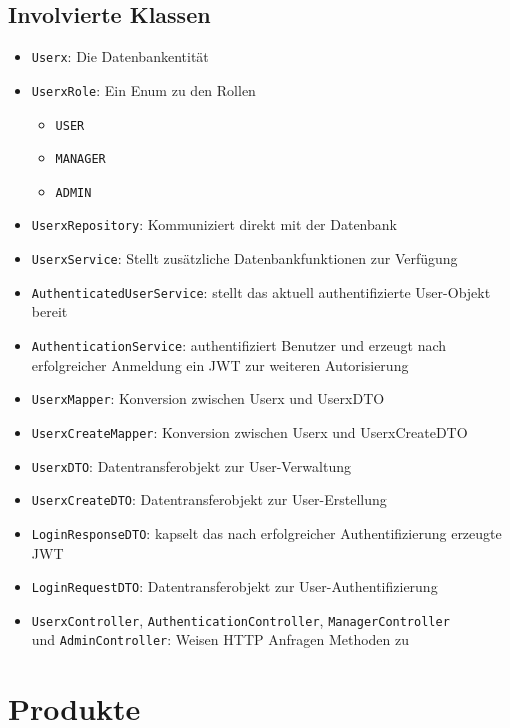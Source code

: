 \documentclass[12pt, a4paper]{scrreprt}
\begin{document}
		
		\section{Involvierte Klassen}
		
		\begin{itemize}
			\item \texttt{Userx}: Die Datenbankentität 
			\item \texttt{UserxRole}: Ein Enum zu den Rollen
			\begin{itemize}
				\item \texttt{USER}
				\item \texttt{MANAGER}
				\item \texttt{ADMIN}
			\end{itemize}
			\item \texttt{UserxRepository}: Kommuniziert direkt mit der Datenbank
			\item \texttt{UserxService}: Stellt zusätzliche Datenbankfunktionen zur Verfügung
			\item \texttt{AuthenticatedUserService}: stellt das aktuell authentifizierte User-Objekt bereit
			\item \texttt{AuthenticationService}: authentifiziert Benutzer und erzeugt nach erfolgreicher Anmeldung ein JWT zur weiteren Autorisierung
			\item \texttt{UserxMapper}: Konversion zwischen Userx und UserxDTO
			\item \texttt{UserxCreateMapper}: Konversion zwischen Userx und UserxCreateDTO
			\item \texttt{UserxDTO}: Datentransferobjekt zur User-Verwaltung
			\item \texttt{UserxCreateDTO}: Datentransferobjekt zur User-Erstellung
			\item \texttt{LoginResponseDTO}: kapselt das nach erfolgreicher Authentifizierung erzeugte JWT
			\item \texttt{LoginRequestDTO}: Datentransferobjekt zur User-Authentifizierung
			\item \texttt{UserxController}, \texttt{AuthenticationController}, \texttt{ManagerController}\\und \texttt{AdminController}: Weisen HTTP Anfragen Methoden zu
		\end{itemize}

	\chapter{Produkte}
	
\end{document}
